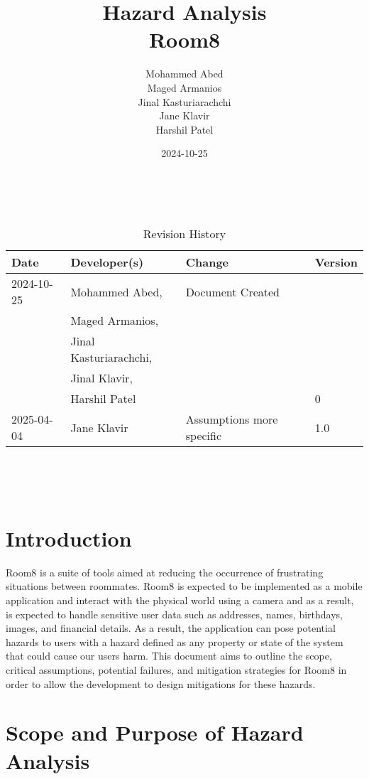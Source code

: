 \documentclass{article}
\title{Hazard Analysis\\Room8}
\author{Mohammed Abed \\ 
        Maged Armanios\\
        Jinal Kasturiarachchi\\
        Jane Klavir\\
        Harshil Patel\\}
\date{2024-10-25}
\begin{document}
\maketitle
\thispagestyle{empty}

~\newpage


\begin{table}[hp]
    \caption{Revision History} \label{TblRevisionHistory}
    \begin{tabularx}{\textwidth}{llXl} %
    \toprule
    \textbf{Date} & \textbf{Developer(s)} & \textbf{Change} & \textbf{Version}\\
    \midrule
    2024-10-25 & Mohammed Abed, & Document Created & \\
     & Maged Armanios, & & \\
     & Jinal Kasturiarachchi, & & \\
     & Jinal Klavir, & & \\
     & Harshil Patel & & 0\\
    \midrule
    2025-04-04 & Jane Klavir & Assumptions more specific & 1.0\\
    \bottomrule
    \end{tabularx}
\end{table}

~\newpage

\tableofcontents

~\newpage


\section{Introduction}

Room8 is a suite of tools aimed at reducing the occurrence of frustrating situations between roommates. Room8 is expected to be implemented as a mobile application and interact with the physical world using a camera and as a result, is expected to handle sensitive user data such as addresses, names, birthdays, images, and financial details. As a result, the application can pose potential hazards to users with a hazard defined as any property or state of the system that could cause our users harm. This document aims to outline the scope, critical assumptions, potential failures, and mitigation strategies for Room8 in order to allow the development to design mitigations for these hazards.


\section{Scope and Purpose of Hazard Analysis}
\end{document}
